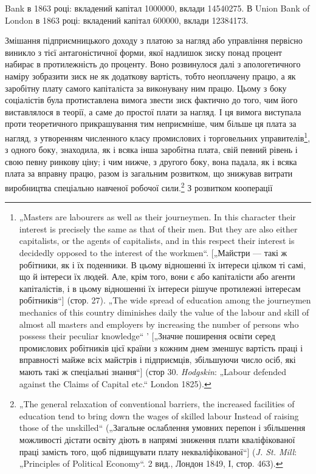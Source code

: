 \parcont{}  %
Bank в 1863 році: вкладений капітал \num{1000000},
вклади \num{14540275}. В Union Bank of London в
1863 році: вкладений капітал \num{600000}, вклади
\num{12384173}.

Змішання підприємницького доходу з платою за нагляд
або управління первісно виникло з тієї антагоністичної форми,
якої надлишок зиску понад процент набирає в протилежність
до проценту. Воно розвинулося далі з апологетичного наміру
зобразити зиск не як додаткову вартість, тобто неоплачену працю,
а як заробітну плату самого капіталіста за виконувану ним працю.
Цьому з боку соціалістів була протиставлена вимога звести зиск
фактично до того, чим його виставлялося в теорії, а саме до простої
плати за нагляд. І ця вимога виступала проти теоретичного
прикрашування тим неприємніше, чим більше ця плата за нагляд,
з утворенням численного класу промислових і торговельних
управителів\footnote{
„Masters are labourers as well as their journeymen. In this character their
interest is precisely the same as that of their men. But they are also either capitalists,
or the agents of capitalists, and in this respect their interest is decidedly
opposed to the interest of the workmen“. [„Майстри — такі ж робітники, як і їх
поденники. В цьому відношенні їх інтереси цілком ті самі, що й інтереси їх людей.
Але, крім того, вони є або капіталісти або агенти капіталістів, і в цьому відношенні
їх інтереси рішуче протилежні інтересам робітників“] (стор. 27). „The
wide spread of education among the journeymen mechanics of this country diminishes
daily the value of the labour and skill of almost all masters and employers
by increasing the number of persons who possess their peculiar knowledge“ ' [„Значне
поширення освіти серед промислових робітників цієї країни з кожним днем
зменшує вартість праці і вправності майже всіх майстрів і підприємців, збільшуючи
число осіб, які мають такі ж спеціальні знання“] (стор 30. \emph{Hodgskin}:
„Labour defended against the Claims of Capital etc.“ London 1825).
}, з одного боку, знаходила, як і всяка інша заробітна
плата, свій певний рівень і свою певну ринкову ціну; і чим
нижче, з другого боку, вона падала, як і всяка плата за вправну
працю, разом із загальним розвитком, що знижував витрати виробництва
спеціально навченої робочої сили.\footnote{
„The general relaxation of conventional barriers, the increased facilities of education
tend to bring down the wages of skilled labour Instead of raising those of
the unskilled“ („Загальне ослаблення умовних перепон і збільшення можливості
дістати освіту діють в напрямі зниження плати кваліфікованої праці замість
того, щоб підвищувати плату некваліфікованої“] (\emph{J. St. Mill}: „Principles of Political
Economy“. 2 вид., Лондон 1849, І, стор. 463).
} З розвитком кооперації
